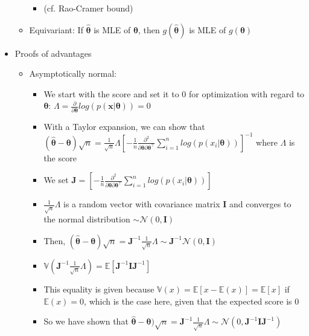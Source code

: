 \begin{itemize}
\begin{itemize}
\begin{itemize}
            \item (cf. Rao-Cramer bound)
        \end{itemize}
        \item Equivariant: If $\hat{\boldsymbol{\theta}}$ is MLE of $\boldsymbol{\theta}$, then $g(\hat{\boldsymbol{\theta}})$ is MLE of $g(\boldsymbol{\theta})$
    \end{itemize}
    \item Proofs of advantages
    \begin{itemize}
        \item Asymptotically normal: 
        \begin{itemize}
            \item We start with the score and set it to 0 for optimization with regard to $\boldsymbol{\theta}$: 
            $\Lambda = \frac{\partial}{\partial \boldsymbol{\theta}} log(p( \boldsymbol{x} | \boldsymbol{\theta})) = 0$
            \item With a Taylor expansion, we can show that $( \hat{\boldsymbol{\theta}} - \boldsymbol{\theta} ) \sqrt{n} = \frac{1}{\sqrt{n}} \Lambda [ -\frac{1}{n} \frac{\partial^2}{\partial \boldsymbol{\theta} \partial \boldsymbol{\theta}^\intercal} \sum_{i=1}^n log (p( x_i | \boldsymbol{\theta})) ]^{-1}$ where $\Lambda$ is the score 
            \item We set $\boldsymbol{J} = [ -\frac{1}{n} \frac{\partial^2}{\partial \boldsymbol{\theta} \partial \boldsymbol{\theta}^\intercal} \sum_{i=1}^n log (p( x_i | \boldsymbol{\theta})) ]$
            \item $\frac{1}{\sqrt{n}} \Lambda$ is a random vector with covariance matrix $\boldsymbol{I}$ and converges to the normal distribution $\sim \mathcal{N}(0,\boldsymbol{I})$
            \item Then, $( \hat{\boldsymbol{\theta}} - \boldsymbol{\theta} ) \sqrt{n} = \boldsymbol{J}^{-1} \frac{1}{\sqrt{n}} \Lambda \sim \boldsymbol{J}^{-1}\mathcal{N}(0,\boldsymbol{I})$
            \item $\mathbb{V}(\boldsymbol{J}^{-1} \frac{1}{\sqrt{n}} \Lambda) = \mathbb{E}[\boldsymbol{J}^{-1}  \boldsymbol{I} \boldsymbol{J}^{-1}]$ 
            \item This equality is given because $\mathbb{V}(x) = \mathbb{E}[x-\mathbb{E}(x)] = \mathbb{E}[x]$ if $\mathbb{E}(x) = 0$, which is the case here, given that the expected score is $0$
            \item So we have shown that $\hat{\boldsymbol{\theta}} - \boldsymbol{\theta} ) \sqrt{n} = \boldsymbol{J}^{-1} \frac{1}{\sqrt{n}} \Lambda \sim \mathcal{N}(0,\boldsymbol{J}^{-1}\boldsymbol{I}\boldsymbol{J}^{-1})$

\end{itemize}
\end{itemize}
\end{itemize}
